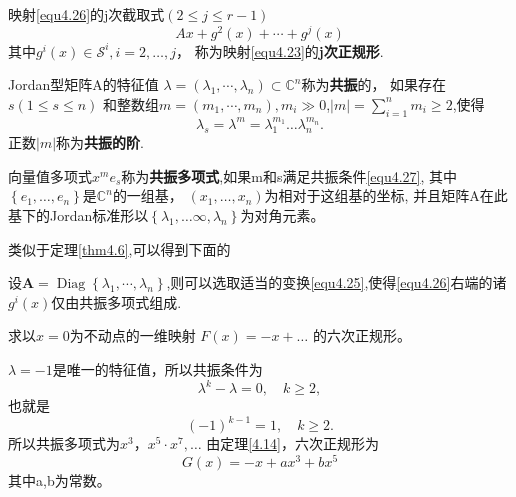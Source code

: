 \begin{defination}

  映射\ref{equ4.26}的j次截取式$( 2 \leqslant j \leqslant r - 1 )$
  \[
A x + g ^ { 2 } ( x ) + \cdots + g ^ { j } ( x )
\]
其中$g ^ { i } ( x ) \in \mathscr { S } ^ { i } , i = 2 , \dots , j$，
称为映射\ref{equ4.23}的\textbf{j次正规形}.
\end{defination}

\begin{defination}
  Jordan型矩阵A的特征值
  $\lambda= \left( \lambda _ { 1 } , \cdots , \lambda _ { n } \right) \subset \mathbb{C} ^ { n }$称为\textbf{共振}的，
  如果存在$s ( 1 \leqslant s \leqslant n )$
  和整数组$m = \left( m _ { 1 } , \cdots , m _ { n } \right) , m _ { i }\gg 0$,$| m | = \sum _ { i = 1 } ^ { n } m _ { i } \geqslant 2$,使得
  \begin{equation}
    \lambda _ { s } = \lambda ^ { m } = \lambda _ { 1 } ^ { m _ { 1 } } \dots \lambda _ { n } ^ { m _n}.
        \label{eq:1.4.27}
  \end{equation}
  正数\(|m|\)称为\textbf{共振的阶}.
\end{defination}

\begin{defination}
  向量值多项式\(x^me_s\)称为\textbf{共振多项式},如果m和s满足共振条件\ref{equ4.27},
  其中$\left\{ e _ { 1 } , \dots , e _ { n } \right\}$是\(\mathbb{C}^n\)的一组基，
  \((x_1,\dots,x_n)\)为相对于这组基的坐标,
  并且矩阵A在此基下的Jordan标准形以$\left\{ \lambda _ { 1 } , \dots \infty , \lambda _ { n } \right\}$为对角元素。
  \label{def:1.4.13}
\end{defination}

类似于定理\ref{thm4.6},可以得到下面的

\begin{theorem}
  设$\boldsymbol { A } = \operatorname { Diag } \left\{ \lambda _ { 1 } , \cdots , \lambda _ { n } \right\}$,则可以选取适当的变换\ref{equ4.25},使得\ref{equ4.26}右端的诸\(g^i(x)\)仅由共振多项式组成.  
\end{theorem}

\begin{example}
  求以\(x=0\)为不动点的一维映射
  \(F(x)=-x+\dots\)
  的六次正规形。
\end{example}

\begin{solve}
  $\lambda = - 1$是唯一的特征值，所以共振条件为
  \[
\lambda ^ { k } - \lambda = 0 , \quad k \geqslant 2,
  \]
  也就是
  \[
( - 1 ) ^ { k - 1 } = 1 , \quad k \geqslant 2.
\]
所以共振多项式为$x ^ { 3 } ， x ^ { 5 } \cdot x ^ { 7 } , \dots$
由定理\ref{4.14}，六次正规形为
\[
G ( x ) = - x + a x ^ { 3 } + b x ^ { 5 }
\]
其中a,b为常数。
\end{solve}

